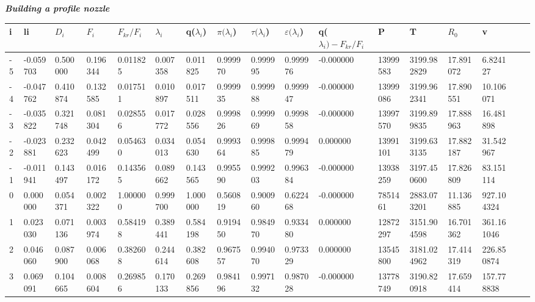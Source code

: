 \documentclass{article}
\begin{document}


\begin{center}
\begin{large}
\textbf{\textit { Building a profile nozzle }} \\
\end{large}
\end{center}

\begin{center}
\begin{tiny}
\begin{tabular}{|l*{16}{l|}}
\hline
i & li & \(D_i\) & \(F_i\) & \(F_{kr}/F_i\) & $\lambda_i$ & q($\lambda_i$) & $\pi(\lambda_i$) & $\tau(\lambda_i$) & $\varepsilon(\lambda_i$) & q($\lambda_i) - F_{kr}/F_i$ & P & T & \(R_0\) & v  \\
\hline
-5 & -0.059703 & 0.500000 & 0.196344 & 0.011825 & 0.007358 & 0.011825 & 0.999970 & 0.999995 & 0.999976 & -0.000000 & 13999583 & 3199.982829 & 17.891072 & 6.824127 \\
-4 & -0.047762 & 0.410874 & 0.132585 & 0.017511 & 0.010897 & 0.017511 & 0.999935 & 0.999988 & 0.999947 & -0.000000 & 13999086 & 3199.962341 & 17.890551 & 10.106071 \\
-3 & -0.035822 & 0.321748 & 0.081304 & 0.028556 & 0.017772 & 0.028556 & 0.999826 & 0.999969 & 0.999858 & -0.000000 & 13997570 & 3199.899835 & 17.888963 & 16.481898 \\
-2 & -0.023881 & 0.232623 & 0.042499 & 0.054630 & 0.034013 & 0.054630 & 0.999364 & 0.999885 & 0.999479 & 0.000000 & 13991101 & 3199.633135 & 17.882187 & 31.542967 \\
-1 & -0.011941 & 0.143497 & 0.016172 & 0.143565 & 0.089662 & 0.143565 & 0.995590 & 0.999203 & 0.996384 & -0.000000 & 13938259 & 3197.450600 & 17.826809 & 83.151114 \\
0 & 0.000000 & 0.054371 & 0.002322 & 1.000000 & 0.999700 & 1.000000 & 0.560819 & 0.900960 & 0.622468 & -0.000000 & 7851461 & 2883.073201 & 11.136885 & 927.104324 \\
1 & 0.023030 & 0.071136 & 0.003974 & 0.584198 & 0.389441 & 0.584198 & 0.919450 & 0.984970 & 0.933480 & 0.000000 & 12872297 & 3151.904598 & 16.701362 & 361.161046 \\
2 & 0.046060 & 0.087900 & 0.006068 & 0.382608 & 0.244614 & 0.382608 & 0.967557 & 0.994070 & 0.973329 & 0.000000 & 13545800 & 3181.024962 & 17.414319 & 226.850874 \\
3 & 0.069091 & 0.104665 & 0.008604 & 0.269856 & 0.170133 & 0.269856 & 0.984196 & 0.997132 & 0.987028 & -0.000000 & 13778749 & 3190.820918 & 17.659414 & 157.778838 \\

\end{tabular}
\end{tiny}
\end{center}
\end{document}
